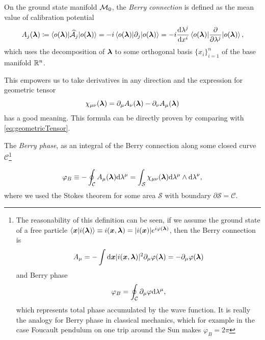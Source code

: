 \begin{definition}    
    On the ground state manifold $\mathcal{M}_0$, the \emph{Berry connection} is defined as the mean value of calibration potential
    \begin{equation}
        A_j({\bm\lambda})\coloneqq \braket{o({\bm\lambda})|\mathcal{\widehat{A}}_j|o({\bm\lambda})}= -i \braket{o({\bm\lambda})|\partial_j|o({\bm\lambda})}= -i\frac{\mathrm{d} \lambda^j}{\mathrm{d} x^i} \braket{o({\bm\lambda})|\frac{\partial }{\partial \lambda^j}|o({\bm\lambda})},
        \label{eq:berryConnection}
    \end{equation}
    which uses the decomposition of ${\bm\lambda}$ to some orthogonal basis $\{x_i\}_{i=1}^n$ of the base manifold $\mathbb{R}^n$. 
\end{definition}
    
This empowers us to take derivatives in any direction and the expression for geometric tensor
\begin{equation}
    \chi_{\mu\nu}({\bm\lambda}) = \partial_\mu A_\nu({\bm\lambda})-\partial_\nu A_\mu({\bm\lambda})
\end{equation}
has a good meaning. This formula can be directly proven by comparing with \ref{eq:geometricTensor}. 


\begin{definition}
    
    The \emph{Berry phase}, as an integral of the Berry connection along some closed curve $\mathcal{C}$\footnote{
        The reasonability of this definition can be seen, if we assume the ground state of a free particle
        $\braket{\bm{x}|i({\bm\lambda})}\equiv i(\bm{x},{\bm\lambda})= |i(\bm{x})|e^{i\varphi({\bm\lambda})}$,
        then the Berry connection is
        \begin{equation}
            A_\mu=-\int \mathrm{d} \bm{x}|i(\bm{x},{\bm\lambda})|^2\partial_\mu \varphi({\bm\lambda}) = -\partial_\mu \varphi({\bm\lambda})
        \end{equation} 
        and Berry phase
        \begin{equation}
            \varphi_B=\oint_\mathcal{C} \partial_\mu \varphi \mathrm{d} \lambda^\mu,
        \end{equation}
        which represents total phase accumulated by the wave function. It is really the analogy for Berry phase in classical mechanics, which for example in the case Foucault pendulum on one trip around the Sun makes $\varphi_B=2\pi$
        }

    \begin{equation}
        \varphi_B\equiv-\oint_\mathcal{C} A_\mu({\bm\lambda})\mathrm{d} \lambda^\mu=\int_\mathcal{S} \chi_{\mu\nu}({\bm\lambda})\mathrm{d} \lambda^\mu \wedge \mathrm{d}\lambda^\nu,
    \end{equation}
    where we used the Stokes theorem for some area $\mathcal{S}$ with boundary $\partial\mathcal{S}=\mathcal{C}$.    
    
\end{definition}

